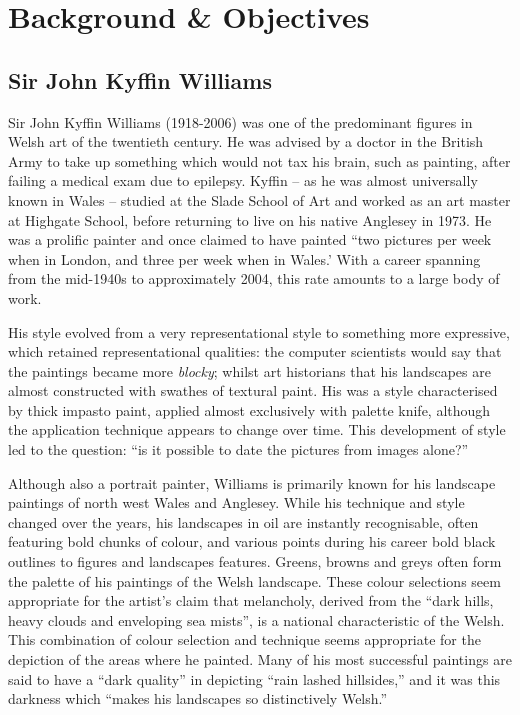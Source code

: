 \chapter{Background \& Objectives}


\section{Sir John Kyffin Williams}

Sir John Kyffin Williams (1918-2006) was one of the predominant figures in Welsh art of the
twentieth century.  He was advised by a doctor in the British Army to take up something which
would not tax his brain, such as painting, after failing a medical exam due to epilepsy. Kyffin --
as he was almost universally known in Wales -- studied at the Slade School of Art and worked as an
art master at Highgate School, before returning to live on his native Anglesey in 1973.  He was a
prolific painter and once claimed to have painted ``two pictures per week when in London, and 
three per week when in Wales.'\cite[p.209]{Williams1993Across} With a career spanning from the 
mid-1940s to approximately 2004, this rate amounts to a large body of work.

His style evolved from a very representational style to something more
expressive, which retained representational qualities: the computer scientists
would say that the paintings became more \emph{blocky}; whilst art
historians that his landscapes are almost constructed with swathes of textural
paint. His was a style characterised by thick impasto paint, applied almost
exclusively with palette knife, although the application technique appears to
change over time. This development of style led to the question: ``is it possible to
date the pictures from images alone?''



Although also a portrait painter, Williams is primarily known for his landscape
paintings of north west Wales and Anglesey. While his technique and style
changed over the years, his landscapes in oil are instantly recognisable, often
featuring bold chunks of colour, and various points during his career bold
black outlines to figures and landscapes features. Greens, browns and greys
often form the palette of his paintings of the Welsh landscape. These colour
selections seem appropriate for the artist’s claim that melancholy, derived
from the ``dark hills, heavy clouds and enveloping sea mists'', is a national
characteristic of the Welsh.\cite{Williams1993Across} This combination of
colour selection and technique seems appropriate for the depiction of the areas
where he painted. Many of his most successful paintings are said to have a
``dark quality'' in depicting ``rain lashed hillsides,'' and it was this
darkness which ``makes his landscapes so distinctively
Welsh.''\cite{Davies2004100} 

